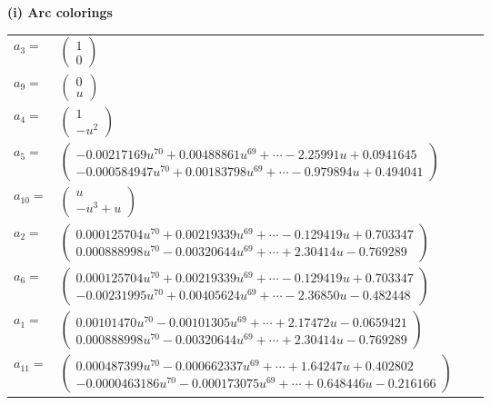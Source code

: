 \documentclass[1p]{elsarticle_modified}
\theoremstyle{definition}
\begin{document}
\flushleft \textbf{(i) Arc colorings}\\
\begin{tabular}{m{7pt} m{180pt} m{7pt} m{180pt} }
\flushright $a_{3}=$&$\begin{pmatrix}1\\0\end{pmatrix}$ \\
\flushright $a_{9}=$&$\begin{pmatrix}0\\u\end{pmatrix}$ \\
\flushright $a_{4}=$&$\begin{pmatrix}1\\- u^2\end{pmatrix}$ \\
\flushright $a_{5}=$&$\begin{pmatrix}-0.00217169 u^{70}+0.00488861 u^{69}+\cdots-2.25991 u+0.0941645\\-0.000584947 u^{70}+0.00183798 u^{69}+\cdots-0.979894 u+0.494041\end{pmatrix}$ \\
\flushright $a_{10}=$&$\begin{pmatrix}u\\- u^3+u\end{pmatrix}$ \\
\flushright $a_{2}=$&$\begin{pmatrix}0.000125704 u^{70}+0.00219339 u^{69}+\cdots-0.129419 u+0.703347\\0.000888998 u^{70}-0.00320644 u^{69}+\cdots+2.30414 u-0.769289\end{pmatrix}$ \\
\flushright $a_{6}=$&$\begin{pmatrix}0.000125704 u^{70}+0.00219339 u^{69}+\cdots-0.129419 u+0.703347\\-0.00231995 u^{70}+0.00405624 u^{69}+\cdots-2.36850 u-0.482448\end{pmatrix}$ \\
\flushright $a_{1}=$&$\begin{pmatrix}0.00101470 u^{70}-0.00101305 u^{69}+\cdots+2.17472 u-0.0659421\\0.000888998 u^{70}-0.00320644 u^{69}+\cdots+2.30414 u-0.769289\end{pmatrix}$ \\
\flushright $a_{11}=$&$\begin{pmatrix}0.000487399 u^{70}-0.000662337 u^{69}+\cdots+1.64247 u+0.402802\\-0.0000463186 u^{70}-0.000173075 u^{69}+\cdots+0.648446 u-0.216166\end{pmatrix}$ \\

\end{tabular}
\end{document}
